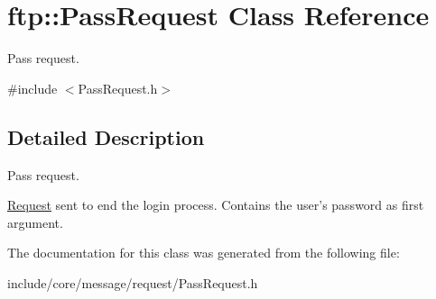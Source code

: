 \hypertarget{classftp_1_1_pass_request}{\section{ftp\-:\-:Pass\-Request Class Reference}
\label{classftp_1_1_pass_request}
}


Pass request.  




{\ttfamily \#include $<$Pass\-Request.\-h$>$}



\subsection{Detailed Description}
Pass request. 

\hyperlink{classftp_1_1_request}{Request} sent to end the login process. Contains the user's password as first argument. 

The documentation for this class was generated from the following file\-:\begin{DoxyCompactItemize}
\item 
include/core/message/request/Pass\-Request.\-h\end{DoxyCompactItemize}
